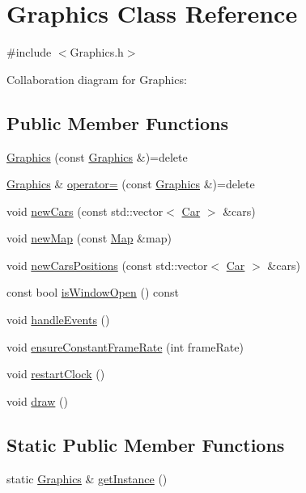 \hypertarget{classGraphics}{}\section{Graphics Class Reference}
\label{classGraphics}


{\ttfamily \#include $<$Graphics.\+h$>$}



Collaboration diagram for Graphics\+:
\subsection*{Public Member Functions}
\begin{DoxyCompactItemize}
\item 
\hyperlink{classGraphics_abe2f13f24a1d35c55fdac10a282744eb}{Graphics} (const \hyperlink{classGraphics}{Graphics} \&)=delete
\item 
\hyperlink{classGraphics}{Graphics} \& \hyperlink{classGraphics_abaf6bc20f9541026835dfee157ac5efb}{operator=} (const \hyperlink{classGraphics}{Graphics} \&)=delete
\item 
void \hyperlink{classGraphics_aee9384443642037cef28b28acddf86d3}{new\+Cars} (const std\+::vector$<$ \hyperlink{classCar}{Car} $>$ \&cars)
\item 
void \hyperlink{classGraphics_adf0937a71f5d477bcd9c553fe863e87b}{new\+Map} (const \hyperlink{classMap}{Map} \&map)
\item 
void \hyperlink{classGraphics_a5f2e6a6cc8dffc34b48e66df42046243}{new\+Cars\+Positions} (const std\+::vector$<$ \hyperlink{classCar}{Car} $>$ \&cars)
\item 
const bool \hyperlink{classGraphics_a21729e7f5db9080db1a766682e64c43a}{is\+Window\+Open} () const
\item 
void \hyperlink{classGraphics_abad4212fb355b9b3d6504ad019832213}{handle\+Events} ()
\item 
void \hyperlink{classGraphics_a283310b7fe274dab0544d307525198dc}{ensure\+Constant\+Frame\+Rate} (int frame\+Rate)
\item 
void \hyperlink{classGraphics_abb78da7bc406f5c9518f7fd3f20b42f8}{restart\+Clock} ()
\item 
void \hyperlink{classGraphics_ad0e7c12771870690d603e9df6643542c}{draw} ()
\end{DoxyCompactItemize}
\subsection*{Static Public Member Functions}
\begin{DoxyCompactItemize}
\item 
static \hyperlink{classGraphics}{Graphics} \& \hyperlink{classGraphics_a115d78c8686f6c82add227bf1fe2c81c}{get\+Instance} ()
\end{DoxyCompactItemize}
